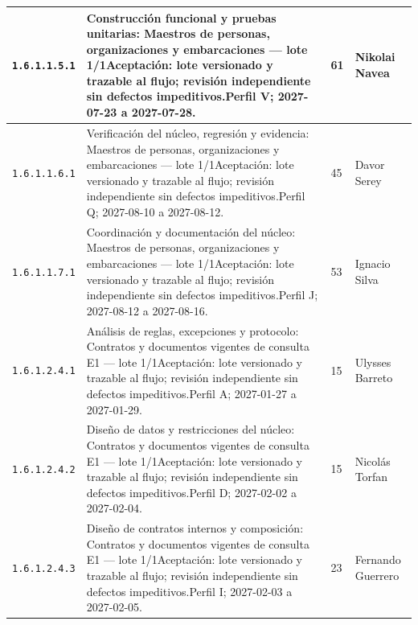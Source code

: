 \begin{longtable}{L{29mm}L{80mm}R{12mm}L{28mm}}
\texttt{1.\allowbreak{}6.\allowbreak{}1.\allowbreak{}1.\allowbreak{}5.\allowbreak{}1} & Construcción funcional y pruebas unitarias: Maestros de personas, organizaciones y embarcaciones — lote 1/1\newline Aceptación: lote versionado y trazable al flujo; revisión independiente sin defectos impeditivos.\newline Perfil V; 2027-07-23 a 2027-07-28. & 61 & Nikolai Navea\\\hline
\texttt{1.\allowbreak{}6.\allowbreak{}1.\allowbreak{}1.\allowbreak{}6.\allowbreak{}1} & Verificación del núcleo, regresión y evidencia: Maestros de personas, organizaciones y embarcaciones — lote 1/1\newline Aceptación: lote versionado y trazable al flujo; revisión independiente sin defectos impeditivos.\newline Perfil Q; 2027-08-10 a 2027-08-12. & 45 & Davor Serey\\\hline
\texttt{1.\allowbreak{}6.\allowbreak{}1.\allowbreak{}1.\allowbreak{}7.\allowbreak{}1} & Coordinación y documentación del núcleo: Maestros de personas, organizaciones y embarcaciones — lote 1/1\newline Aceptación: lote versionado y trazable al flujo; revisión independiente sin defectos impeditivos.\newline Perfil J; 2027-08-12 a 2027-08-16. & 53 & Ignacio Silva\\\hline
\texttt{1.\allowbreak{}6.\allowbreak{}1.\allowbreak{}2.\allowbreak{}4.\allowbreak{}1} & Análisis de reglas, excepciones y protocolo: Contratos y documentos vigentes de consulta E1 — lote 1/1\newline Aceptación: lote versionado y trazable al flujo; revisión independiente sin defectos impeditivos.\newline Perfil A; 2027-01-27 a 2027-01-29. & 15 & Ulysses Barreto\\\hline
\texttt{1.\allowbreak{}6.\allowbreak{}1.\allowbreak{}2.\allowbreak{}4.\allowbreak{}2} & Diseño de datos y restricciones del núcleo: Contratos y documentos vigentes de consulta E1 — lote 1/1\newline Aceptación: lote versionado y trazable al flujo; revisión independiente sin defectos impeditivos.\newline Perfil D; 2027-02-02 a 2027-02-04. & 15 & Nicolás Torfan\\\hline
\texttt{1.\allowbreak{}6.\allowbreak{}1.\allowbreak{}2.\allowbreak{}4.\allowbreak{}3} & Diseño de contratos internos y composición: Contratos y documentos vigentes de consulta E1 — lote 1/1\newline Aceptación: lote versionado y trazable al flujo; revisión independiente sin defectos impeditivos.\newline Perfil I; 2027-02-03 a 2027-02-05. & 23 & Fernando Guerrero\\\hline

\end{longtable}
